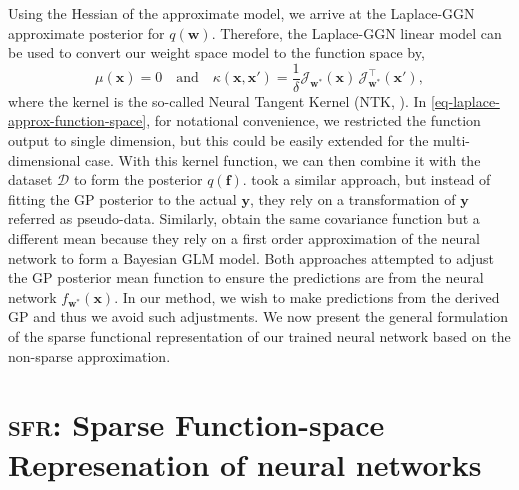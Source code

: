 \documentclass{article}
\newcommand{\our}{\textsc{sfr}\xspace}
\newcommand{\dataset}{\ensuremath{\mathcal{D}}}
\newcommand{\weights}{\ensuremath{\mathbf{w}}}
\newcommand{\mbf}[1]{\mathbf{#1}}
\newcommand{\vf}{\mbf{f}}
\newcommand{\vx}{\mbf{x}}
\newcommand{\vy}{\mbf{y}}
\newcommand{\vw}{\mbf{w}}
\newcommand{\Jac}[2]{\mathcal{J}_{#1}(#2)}
\newcommand{\JacT}[2]{\mathcal{J}_{#1}^\top(#2)}
\newcommand{\GP}{\mathcal{GP}}
\begin{document}
Using the Hessian of the approximate model, we arrive at the Laplace-GGN approximate posterior for $q(\vw)$.
Therefore, the Laplace-GGN linear model can be used to convert our weight space model to the function space by,
\begin{equation} 
\label{eq-laplace-approx-function-space}
  \mu(\vx) =  0 \quad \text{and} \quad
  \kappa(\vx, \vx')
  = \frac{1}{\delta} \Jac{\weights^*}{\vx} \, \JacT{\weights^*}{\vx'}, 
\end{equation}
where the kernel is the so-called Neural Tangent Kernel (NTK, \cite{jacot2018neural}). In \cref{eq-laplace-approx-function-space}, for notational convenience, we restricted the function output to single dimension, but this could be easily extended for the multi-dimensional case. With this kernel function, we can then combine it with the dataset $\dataset$ to form the posterior $q(\vf)$. \citet{khan2019approximate} took a similar approach, but instead of fitting the GP posterior to the actual $\vy$, they rely on a transformation of $\vy$ referred as pseudo-data. Similarly, \citet{immer2021improving} obtain the same covariance function but a different mean because they rely on a first order approximation of the neural network to form a Bayesian GLM model. Both approaches attempted to adjust the GP posterior mean function to ensure the predictions are from the neural network $f_{\vw^*}(\vx)$. In our method, we wish to make predictions from the derived GP and thus we avoid such adjustments. We now present the general formulation of the sparse functional representation of our trained neural network based on the non-sparse approximation. 



\section{\our: Sparse Function-space Represenation of neural networks}
\end{document}
